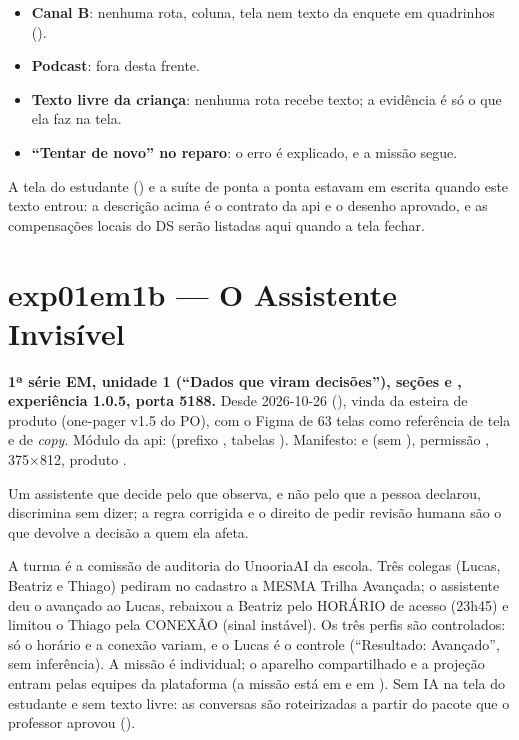 \begin{itemize}
  \item \textbf{Canal B}: nenhuma rota, coluna, tela nem texto da enquete em
    quadrinhos ().
  \item \textbf{Podcast}: fora desta frente.
  \item \textbf{Texto livre da criança}: nenhuma rota recebe texto; a
    evidência é só o que ela faz na tela.
  \item \textbf{\enquote{Tentar de novo} no reparo}: o erro é explicado, e
    a missão segue.
\end{itemize}

\begin{nota}
A tela do estudante () e a suíte de ponta a
ponta  estavam em escrita
quando este texto entrou: a descrição acima é o contrato da api e o desenho
aprovado, e as compensações locais do DS serão listadas aqui quando a tela
fechar.
\end{nota}

\section{exp01em1b --- O Assistente Invisível}
\label{sec:exp01em1b}

\textbf{1ª série EM, unidade 1 (\enquote{Dados que viram decisões}), seções
 e , experiência 1.0.5, porta 5188.} Desde
2026-10-26 (), vinda da esteira de produto (one-pager v1.5 do
PO), com o Figma de 63 telas como referência de tela e de \emph{copy}. Módulo
da api:  (prefixo ,
tabelas ). Manifesto:  e  (sem
), permissão , 375$\times$812, produto .

\begin{destaque}
Um assistente que decide pelo que observa, e não pelo que a pessoa declarou,
discrimina sem dizer; a regra corrigida e o direito de pedir revisão humana
são o que devolve a decisão a quem ela afeta.
\end{destaque}

A turma é a comissão de auditoria do UnooriaAI da escola. Três colegas
(Lucas, Beatriz e Thiago) pediram no cadastro a MESMA Trilha Avançada; o
assistente deu o avançado ao Lucas, rebaixou a Beatriz pelo HORÁRIO de acesso
(23h45) e limitou o Thiago pela CONEXÃO (sinal instável). Os três perfis são
controlados: só o horário e a conexão variam, e o Lucas é o controle
(\enquote{Resultado: Avançado}, sem inferência). A missão é individual; o
aparelho compartilhado e a projeção entram pelas equipes da plataforma (a
missão está em  e em
). Sem IA na tela do estudante e sem texto
livre: as conversas são roteirizadas a partir do pacote que o
professor aprovou ().

